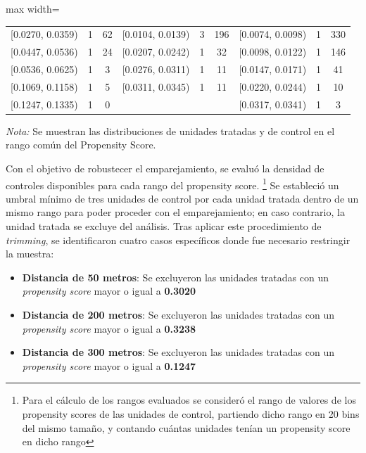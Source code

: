 \begin{table}[htbp]
\begin{adjustbox}{max width=\textwidth}
\begin{tabular}{l c c l c c l c c}
        {[}0.0270, 0.0359) & 1 & 62 & {[}0.0104, 0.0139) & 3 & 196 & {[}0.0074, 0.0098) & 1 & 330 \\
        {[}0.0447, 0.0536) & 1 & 24 & {[}0.0207, 0.0242) & 1 & 32 & {[}0.0098, 0.0122) & 1 & 146 \\
        {[}0.0536, 0.0625) & 1 & 3 & {[}0.0276, 0.0311) & 1 & 11 & {[}0.0147, 0.0171) & 1 & 41 \\
        {[}0.1069, 0.1158) & 1 & 5 & {[}0.0311, 0.0345) & 1 & 11 & {[}0.0220, 0.0244) & 1 & 10 \\
        {[}0.1247, 0.1335) & 1 & 0 &  &  &  & {[}0.0317, 0.0341) & 1 & 3 \\
        \bottomrule
    \end{tabular}
    \end{adjustbox}
    \vspace{0.4em}
    \begin{minipage}{0.93\textwidth}
        \scriptsize \textit{Nota:} Se muestran las distribuciones de unidades tratadas y de control en el rango común del Propensity Score.
    \end{minipage}
\end{table}

Con el objetivo de robustecer el emparejamiento, se evaluó la densidad de controles disponibles para cada rango del propensity score. \footnote{Para el cálculo de los rangos evaluados se consideró el rango de valores de los propensity scores de las unidades de control, partiendo dicho rango en 20 bins del mismo tamaño, y contando cuántas unidades tenían un propensity score en dicho rango} Se estableció un umbral mínimo de tres unidades de control por cada unidad tratada dentro de un mismo rango para poder proceder con el emparejamiento; en caso contrario, la unidad tratada se excluye del análisis. Tras aplicar este procedimiento de \textit{trimming}, se identificaron cuatro casos específicos donde fue necesario restringir la muestra: 
 
\begin{itemize}
    \item \textbf{Distancia de 50 metros}: Se excluyeron las unidades tratadas con un \textit{propensity score} mayor o igual a \textbf{0.3020}
    \item \textbf{Distancia de 200 metros}: Se excluyeron las unidades tratadas con un \textit{propensity score} mayor o igual a \textbf{0.3238}
    \item \textbf{Distancia de 300 metros}: Se excluyeron las unidades tratadas con un \textit{propensity score} mayor o igual a \textbf{0.1247}
\end{itemize}

